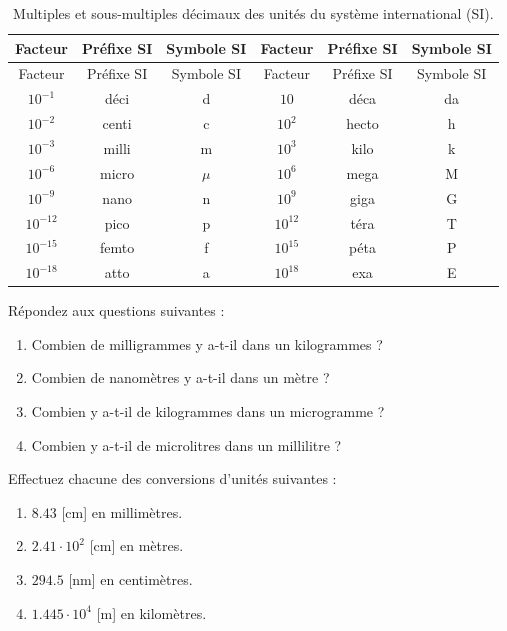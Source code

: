\documentclass[
  11pt,
  french,
  a4paper,
  openany]{book}
\providecommand{\tightlist}{%
  \setlength{\itemsep}{0pt}\setlength{\parskip}{0pt}}
\begin{document}
\begin{longtable}[]{@{}cccccc@{}}
\caption{\label{tab:tab-SImultiples} Multiples et sous-multiples décimaux des unités du système international (SI).}\tabularnewline
\toprule
Facteur & Préfixe SI & Symbole SI & Facteur & Préfixe SI & Symbole SI\tabularnewline
\midrule
\endfirsthead
\toprule
Facteur & Préfixe SI & Symbole SI & Facteur & Préfixe SI & Symbole SI\tabularnewline
\midrule
\endhead
\(10^{-1}\) & déci & d & \(10\) & déca & da\tabularnewline
\(10^{-2}\) & centi & c & \(10^{2}\) & hecto & h\tabularnewline
\(10^{-3}\) & milli & m & \(10^{3}\) & kilo & k\tabularnewline
\(10^{-6}\) & micro & \(\mu\) & \(10^{6}\) & mega & M\tabularnewline
\(10^{-9}\) & nano & n & \(10^{9}\) & giga & G\tabularnewline
\(10^{-12}\) & pico & p & \(10^{12}\) & téra & T\tabularnewline
\(10^{-15}\) & femto & f & \(10^{15}\) & péta & P\tabularnewline
\(10^{-18}\) & atto & a & \(10^{18}\) & exa & E\tabularnewline
\bottomrule
\end{longtable}

\newpage

\begin{Exercise}

Répondez aux questions suivantes :

\begin{enumerate}
\def\labelenumi{\arabic{enumi}.}
\item
  Combien de milligrammes y a-t-il dans un kilogrammes ?
\item
  Combien de nanomètres y a-t-il dans un mètre ?
\item
  Combien y a-t-il de kilogrammes dans un microgramme ?
\item
  Combien y a-t-il de microlitres dans un millilitre ?
\end{enumerate}

Effectuez chacune des conversions d'unités suivantes :

\begin{enumerate}
\def\labelenumi{\arabic{enumi}.}
\setcounter{enumi}{4}
\tightlist
\item
  \(8.43\) {[}cm{]} en millimètres.
\item
  \(2.41 \cdot 10^{2}\) {[}cm{]} en mètres.
\item
  \(294.5\) {[}nm{]} en centimètres.
\item
  \(1.445 \cdot 10^{4}\) {[}m{]} en kilomètres.
\end{enumerate}


\end{Exercise}
\end{document}
